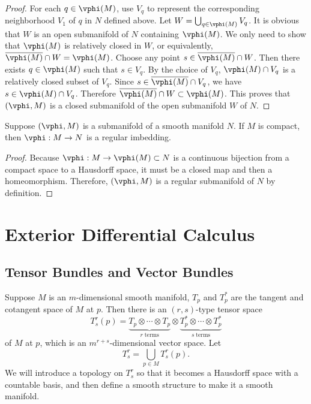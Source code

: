 \documentclass[11pt]{article}
\begin{document}
\begin{proof}
    For each $q \in \vphi(M)$, use $V_q$ to represent the corresponding neighborhood $V_1$ of $q$ in $N$ defined above. Let $W = \bigcup_{q \in \vphi(M)}V_q$. It is obvious that $W$ is an open submanifold of $N$ containing $\vphi(M)$. We only need to show that $\vphi(M)$ is relatively closed in $W$, or equivalently, $\overline{\vphi(M)} \cap W = \vphi(M)$. Choose any point $s \in \overline{\vphi(M)} \cap W$. Then there exists $q \in \vphi(M)$ such that $s \in V_q$. By the choice of $V_q$, $\vphi(M) \cap V_q$ is a relatively closed subset of $V_q$. Since $s \in \overline{\vphi(M)} \cap V_q$, we have $s \in \vphi(M) \cap V_q$. Therefore $\overline{\vphi(M)} \cap W \subset \vphi(M)$. This proves that $(\vphi, M)$ is a closed submanifold of the open submanifold $W$ of $N$. 
\end{proof}

\begin{theorem}
    Suppose $(\vphi, M)$ is a submanifold of a smooth manifold $N$. If $M$ is compact, then $\vphi : M \rightarrow N$ is a regular imbedding. 
\end{theorem}
\begin{proof}
    Because $\vphi : M \rightarrow \vphi(M) \subset N$ is a continuous bijection from a compact space to a Hausdorff space, it must be a closed map and then a homeomorphism. Therefore, $(\vphi, M)$ is a regular submanifold of $N$ by definition. 
\end{proof}

\section{Exterior Differential Calculus}

\def\GL{\text{GL}}
\def\SL{\text{SL}}
\def\O{\text{O}}
\def\gl{\text{gl}}
\def\sl{\text{sl}}

\subsection{Tensor Bundles and Vector Bundles}

Suppose $M$ is an $m$-dimensional smooth manifold, $T_p$ and $T^*_p$ are the tangent and cotangent space of $M$ at $p$. Then there is an $(r, s)$-type tensor space $$T^r_s(p) = \underbrace{T_p \otimes \cdots \otimes T_p}_{r \;\text{terms}} \otimes \underbrace{T^*_p \otimes \cdots \otimes T^*_p}_{s \;\text{terms}}$$ of $M$ at $p$, which is an $m^{r+s}$-dimensional vector space. Let $$T^r_s = \bigcup_{p \in M} T^r_s(p).$$ We will introduce a topology on $T^r_s$ so that it becomes a Hausdorff space with a countable basis, and then define a smooth structure to make it a smooth manifold. 
\end{document}
